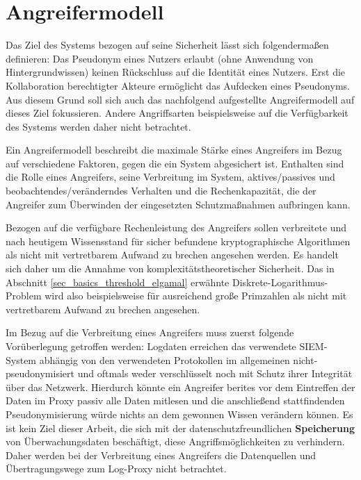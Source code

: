 \section{Angreifermodell}

\label{subsec_impl_requirements_attackermodel}



Das Ziel des Systems bezogen auf seine Sicherheit lässt sich folgendermaßen definieren: Das Pseudonym eines Nutzers erlaubt (ohne Anwendung von Hintergrundwissen) keinen Rückschluss auf die Identität eines Nutzers. Erst die Kollaboration berechtigter Akteure ermöglicht das Aufdecken eines Pseudonyms. Aus diesem Grund soll sich auch das nachfolgend aufgestellte Angreifermodell auf dieses Ziel fokussieren. Andere Angriffsarten beispielsweise auf die Verfügbarkeit des Systems werden daher nicht betrachtet.

Ein Angreifermodell beschreibt die maximale Stärke eines Angreifers im Bezug auf verschiedene Faktoren, gegen die ein System abgesichert ist. Enthalten sind die Rolle eines Angreifers, seine Verbreitung im System, aktives/passives und beobachtendes/veränderndes Verhalten und die Rechenkapazität, die der Angreifer zum Überwinden der eingesetzten Schutzmaßnahmen aufbringen kann. \cite{baumann2014kryptographische} 

Bezogen auf die verfügbare Rechenleistung des Angreifers sollen verbreitete und nach heutigem Wissensstand für sicher befundene kryptographische Algorithmen als nicht mit vertretbarem Aufwand zu brechen angesehen werden. Es handelt sich daher um die Annahme von komplexitätstheoretischer Sicherheit. Das in Abschnitt \ref{sec_basics_threshold_elgamal} erwähnte Diskrete-Logarithmus-Problem wird also beispielsweise für ausreichend große Primzahlen als nicht mit vertretbarem Aufwand zu brechen angesehen.

Im Bezug auf die Verbreitung eines Angreifers muss zuerst folgende Vorüberlegung getroffen werden: 
Logdaten erreichen das verwendete SIEM-System abhängig von den verwendeten Protokollen im allgemeinen nicht-pseudonymisiert und oftmals weder verschlüsselt noch mit Schutz ihrer Integrität über das Netzwerk. Hierdurch könnte ein Angreifer berites vor dem Eintreffen der Daten im Proxy passiv alle Daten mitlesen und die anschließend stattfindenden Pseudonymisierung würde nichts an dem gewonnen Wissen verändern können.
Es ist kein Ziel dieser Arbeit, die sich mit der datenschutzfreundlichen \textbf{Speicherung} von Überwachungsdaten beschäftigt, diese Angriffsmöglichkeiten zu verhindern. Daher werden bei der Verbreitung eines Angreifers die Datenquellen und Übertragungswege zum Log-Proxy nicht betrachtet.

